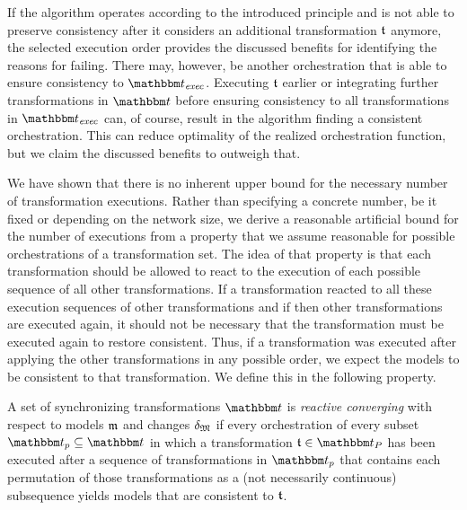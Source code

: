 If the algorithm operates according to the introduced principle and is not able to preserve consistency after it considers an additional transformation $\transformation{t}$ anymore, the selected execution order provides the discussed benefits for identifying the reasons for failing.
There may, however, be another orchestration that is able to ensure consistency to $\transformationset{T}_\mathvariable{exec}$. Executing $\transformation{t}$ earlier or integrating further transformations in $\transformationset{T}$ before ensuring consistency to all transformations in $\transformationset{T}_\mathvariable{exec}$ can, of course, result in the algorithm finding a consistent orchestration.
This can reduce optimality of the realized orchestration function, but we claim the discussed benefits to outweigh that.

We have shown that there is no inherent upper bound for the necessary number of transformation executions.
Rather than specifying a concrete number, be it fixed or depending on the network size, we derive a reasonable artificial bound for the number of executions from a property that we assume reasonable for possible orchestrations of a transformation set.
The idea of that property is that each transformation should be allowed to react to the execution of each possible sequence of all other transformations.
If a transformation reacted to all these execution sequences of other transformations and if then other transformations are executed again, it should not be necessary that the transformation must be executed again to restore consistent.
Thus, if a transformation was executed after applying the other transformations in any possible order, we expect the models to be consistent to that transformation.
We define this in the following property.

\begin{definition}
    \label{def:reactiveconverging}
    A set of synchronizing transformations $\transformationset{T}$ is \emph{reactive converging} with respect to models $\modeltuple{m}$ and changes $\changetuple{\metamodeltuple{M}}$ if every orchestration of every subset $\transformationset{T}_p \subseteq \transformationset{T}$ in which a transformation $\transformation{t} \in \transformationset{T}_P$ has been executed after a sequence of transformations in $\transformationset{T}_p$ that contains each permutation of those transformations as a (not necessarily continuous) subsequence yields models that are consistent to $\transformation{t}$.
\end{definition}

